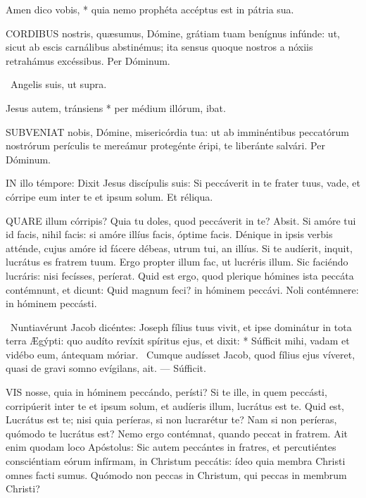  Amen dico vobis, * quia nemo prophéta accéptus est in pátria sua.


\lettrine[lines=2]{C}{ORDIBUS} nostris, quæsumus, Dómine, grátiam tuam benígnus infúnde: ut, sicut ab escis carnálibus abstinémus; ita sensus quoque nostros a nóxiis retrahámus excéssibus. Per Dóminum.

\V\ Angelis suis, ut supra.

 Jesus autem, tránsiens * per médium illórum, ibat.


\lettrine[lines=2]{S}{UBVENIAT} nobis, Dómine, misericórdia tua: ut ab imminéntibus peccatórum nostrórum perículis te mereámur protegénte éripi, te liberánte salvári. Per Dóminum.

\sectionornament




\lettrine[lines=2]{I}{N} illo témpore: Dixit Jesus discípulis suis: Si peccáverit in te frater tuus, vade, et córripe eum inter te et ipsum solum. Et réliqua.



\lettrine[lines=2]{Q}{UARE} illum córripis? Quia tu doles, quod peccáverit in te? Absit. Si amóre tui id facis, nihil facis: si amóre illíus facis, óptime facis. Dénique in ipsis verbis atténde, cujus amóre id fácere débeas, utrum tui, an illíus. Si te audíerit, inquit, lucrátus es fratrem tuum. Ergo propter illum fac, ut lucréris illum. Sic faciéndo lucráris: nisi fecísses, períerat. Quid est ergo, quod plerique hómines ista peccáta contémnunt, et dicunt: Quid magnum feci? in hóminem peccávi. Noli contémnere: in hóminem peccásti.

\R\ Nuntiavérunt Jacob dicéntes: Joseph fílius tuus vivit, et ipse dominátur in tota terra Ægýpti: quo audíto revíxit spíritus ejus, et dixit: * Súfficit mihi, vadam et vidébo eum, ántequam móriar. \V\ Cumque audísset Jacob, quod fílius ejus víveret, quasi de gravi somno evígilans, ait. --- Súfficit.


\lettrine[lines=2]{V}{IS} nosse, quia in hóminem peccándo, perísti? Si te ille, in quem peccásti, corripúerit inter te et ipsum solum, et audíeris illum, lucrátus est te. Quid est, Lucrátus est te; nisi quia períeras, si non lucrarétur te? Nam si non períeras, quómodo te lucrátus est? Nemo ergo contémnat, quando peccat in fratrem. Ait enim quodam loco Apóstolus: Sic autem peccántes in fratres, et percutiéntes consciéntiam eórum infírmam, in Christum peccátis: ídeo quia membra Christi omnes facti sumus. Quómodo non peccas in Christum, qui peccas in membrum Christi?

